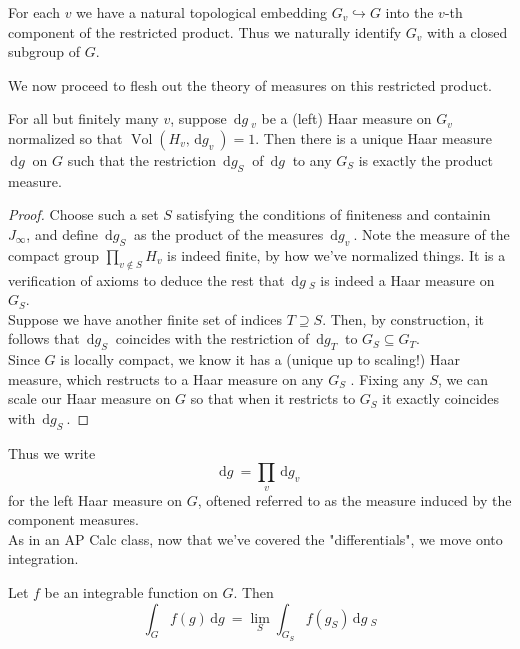 \documentclass[11pt, x11names, openany]{book}
\newcommand{\inj}{\hookrightarrow}
\newcommand{\dg}{\, \mathrm{d}g \ }
\renewcommand{\d}[1]{\, \mathrm{d}#1 \ }
\DeclareMathOperator{\vol}{Vol}
\begin{document}
\begin{observation}
    For each $v$ we have a natural topological embedding $G_v \inj G$ into the $v$-th component of the restricted product. Thus we naturally identify $G_v$ with a closed subgroup of $G$.
\end{observation}


We now proceed to flesh out the theory of measures on this restricted product.

\begin{prop}
\label{Haar Measure on restricted product}
For all but finitely many $v$, suppose $\dg_v$ be a (left) Haar measure on $G_v$ normalized so that $\vol(H_v, \d{g_v}) = 1$. Then there is a unique Haar measure $\dg$ on $G$ such that the restriction $\d{g_S}$ of $\dg$ to any $G_S$ is exactly the product measure.
\end{prop}
\begin{proof}
Choose such a set $S$ satisfying the conditions of finiteness and containin $J_\infty$, and define $\d{g_S}$ as the product of the measures $\d{g_v}$. Note the measure of the compact group $\prod_{v \notin S} H_v$ is indeed finite, by how we've normalized things. It is a verification of axioms to deduce the rest that $\dg_S$ is indeed a Haar measure on $G_S$.\\
Suppose we have another finite set of indices $T \supseteq S$. Then, by construction,
it follows that $\d{g_S}$ coincides with the restriction of $\d{g_T}$ to $G_S \subseteq G_T$.\\

Since $G$ is locally compact, we know it has a (unique up to scaling!) Haar measure, which restructs to a Haar measure on any $G_S$ . Fixing any $S$, we can scale our Haar measure on $G$ so that when it restricts to $G_S$ it exactly coincides with $\d{g_S}$. 
\end{proof}

Thus we write 
\begin{equation}
\label{eqn: measure on restricted product}
    \dg = \prod_v \d{g_v}
\end{equation}
for the left Haar measure on $G$, oftened referred to as the measure induced by the component measures.\\

As in an AP Calc class, now that we've covered the "differentials", we move onto integration.
\begin{prop}
\label{Restricted Product Integral is limit of finite integrals}

Let $f$ be an integrable function on $G$. Then
\begin{equation*}
    \int_G f(g) \dg = \lim_S \int_{G_S}f(g_S) \dg_S
\end{equation*}

\end{prop}
\end{document}
